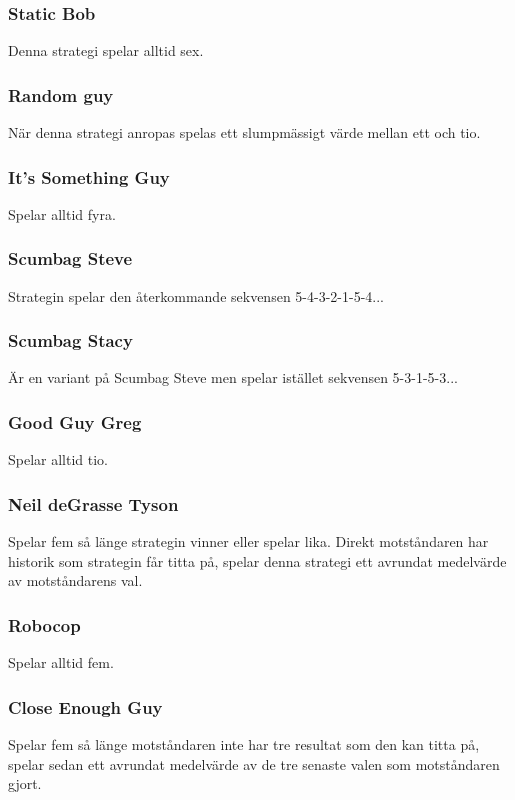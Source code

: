 \subsubsection{Static Bob}
Denna strategi spelar alltid sex.

\subsubsection{Random guy}
När denna strategi anropas spelas ett slumpmässigt värde mellan ett och tio.

\subsubsection{It’s Something Guy}
Spelar alltid fyra.

\subsubsection{Scumbag Steve}
Strategin spelar den återkommande sekvensen 5-4-3-2-1-5-4...

\subsubsection{Scumbag Stacy}
Är en variant på Scumbag Steve men spelar istället sekvensen 5-3-1-5-3...

\subsubsection{Good Guy Greg}
Spelar alltid tio.

\subsubsection{Neil deGrasse Tyson}
Spelar fem så länge strategin vinner eller spelar lika. Direkt motståndaren har historik som strategin får titta på, spelar denna strategi ett avrundat medelvärde av motståndarens val.

\subsubsection{Robocop}
Spelar alltid fem.

\subsubsection{Close Enough Guy}
Spelar fem så länge motståndaren inte har tre resultat som den kan titta på, spelar sedan ett avrundat medelvärde av de tre senaste valen som motståndaren gjort.

